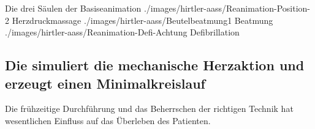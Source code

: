 \begin{PictureSeriesWide}{}{Die drei Säulen der Basiseanimation}
{./images/hirtler-aass/Reanimation-Position-2}
{Herzdruckmassage \label{fig:druckpunkt}}
{./images/hirtler-aass/Beutelbeatmung1}
{Beatmung }
{./images/hirtler-aass/Reanimation-Defi-Achtung}
{Defibrillation }
{}
{}
\end{PictureSeriesWide}

\subsection{Die  simuliert die mechanische Herzaktion und erzeugt einen Minimalkreislauf}

\Text{{\TxBeschreibung}}
{%
%
Die frühzeitige Durchführung 
und das Beherrschen der richtigen Technik 
hat wesentlichen Einfluss auf das Überleben des Patienten. 
%
}


